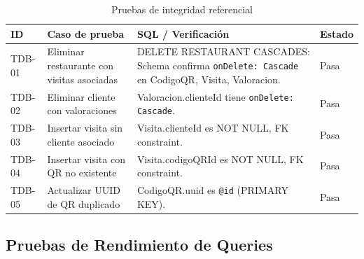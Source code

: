 \begin{table}[H]
    \centering
    \caption{Pruebas de integridad referencial}
    \label{tab:db_integridad}
    \small
    \begin{tabular}{|>{\raggedright\arraybackslash}p{}|>{\raggedright\arraybackslash}p{}|>{\raggedright\arraybackslash}p{}|>{\raggedright\arraybackslash}p{}|}
        \hline
        \textbf{ID} & \textbf{Caso de prueba} & \textbf{SQL / Verificación} & \textbf{Estado} \\
        \hline
        TDB-01 & Eliminar restaurante con visitas asociadas & DELETE RESTAURANT CASCADES: Schema confirma \texttt{onDelete: Cascade} en CodigoQR, Visita, Valoracion. & Pasa \\
        \hline
        TDB-02 & Eliminar cliente con valoraciones & Valoracion.clienteId tiene \texttt{onDelete: Cascade}. & Pasa \\
        \hline
        TDB-03 & Insertar visita sin cliente asociado & Visita.clienteId es NOT NULL, FK constraint. & Pasa \\
        \hline
        TDB-04 & Insertar visita con QR no existente & Visita.codigoQRId es NOT NULL, FK constraint. & Pasa \\
        \hline
        TDB-05 & Actualizar UUID de QR duplicado & CodigoQR.uuid es \texttt{@id} (PRIMARY KEY). & Pasa \\
        \hline
    \end{tabular}
\end{table}

\subsection{Pruebas de Rendimiento de Queries}

